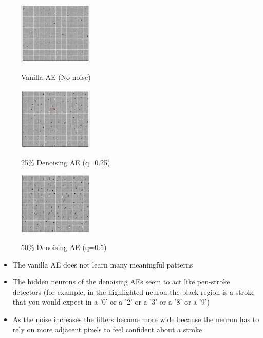 \begin{frame}
    \begin{figure}
        \includegraphics[width=\linewidth,height=3cm]{images/cross-entropy-loss.png}
        \label{fig:awesome_image1}
        \caption{Vanilla AE (No noise)}
    \endminipage\hfill
        \includegraphics[width=\linewidth, height=3cm]{images/25_edited2.png}
        \label{fig:awesome_image2}
        \caption{25\% Denoising AE (q=0.25)}
    \endminipage\hfill
        \includegraphics[width=\linewidth,height=3cm]{images/50.png}
        \label{fig:awesome_image3}
        \caption{50\% Denoising AE (q=0.5)}
    \endminipage
    \end{figure}

    \begin{itemize}\justifying
        \item<1-> The vanilla AE does not learn many meaningful patterns
        \item<2-> The hidden neurons of the denoising AEs seem to act like pen-stroke detectors (for example, in the highlighted neuron the black region is a stroke that you would expect in a '0' or a '2' or a '3' or a '8' or a '9')  
        \item<3-> As the noise increases the filters become more wide because the neuron has to rely on more adjacent pixels to feel confident about a stroke
    \end{itemize}
\end{frame}

